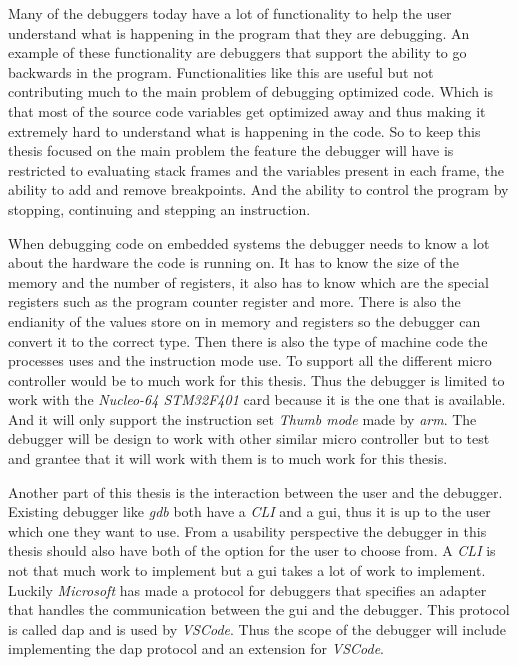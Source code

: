 Many of the debuggers today have a lot of functionality to help the user understand what is happening in the program that they are debugging.
An example of these functionality are debuggers that support the ability to go backwards in the program.
Functionalities like this are useful but not contributing much to the main problem of debugging optimized code.
Which is that most of the source code variables get optimized away and thus making it extremely hard to understand what is happening in the code.
So to keep this thesis focused on the main problem the feature the debugger will have is restricted to evaluating stack frames and the variables present in each frame, the ability to add and remove breakpoints.
And the ability to control the program by stopping, continuing and stepping an instruction.


When debugging code on embedded systems the debugger needs to know a lot about the hardware the code is running on.
It has to know the size of the memory and the number of registers, it also has to know which are the special registers such as the program counter register and more.
There is also the endianity of the values store on in memory and registers so the debugger can convert it to the correct type.
Then there is also the type of machine code the processes uses and the instruction mode use.
To support all the different micro controller would be to much work for this thesis.
Thus the debugger is limited to work with the \emph{Nucleo-64 STM32F401} card because it is the one that is available.
And it will only support the instruction set \emph{Thumb mode} made by \emph{arm}.
The debugger will be design to work with other similar micro controller but to test and grantee that it will work with them is to much work for this thesis.


Another part of this thesis is the interaction between the user and the debugger.
Existing debugger like \emph{gdb} both have a \emph{CLI} and a \acrfull{gui}, thus it is up to the user which one they want to use.
From a usability perspective the debugger in this thesis should also have both of the option for the user to choose from.
A \emph{CLI} is not that much work to implement but a \acrshort{gui} takes a lot of work to implement.
Luckily \emph{Microsoft} has made a protocol for debuggers that specifies an adapter that handles the communication between the \acrshort{gui} and the debugger.
This protocol is called \acrfull{dap} and is used by \emph{VSCode}.
Thus the scope of the debugger will include implementing the \acrshort{dap} protocol and an extension for \emph{VSCode}.


